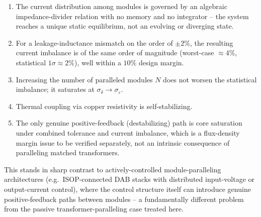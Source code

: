 \documentclass[11pt,a4paper]{article}
\begin{document}
\begin{enumerate}
  \item The current distribution among modules is governed by an algebraic impedance-divider relation with no memory and no integrator -- the system reaches a unique static equilibrium, not an evolving or diverging state.
  \item For a leakage-inductance mismatch on the order of $\pm 2\%$, the resulting current imbalance is of the same order of magnitude (worst-case $\approx 4\%$, statistical $1\sigma\approx 2\%$), well within a $10\%$ design margin.
  \item Increasing the number of paralleled modules $N$ does not worsen the statistical imbalance; it saturates at $\sigma_\delta\to\sigma_\varepsilon$.
  \item Thermal coupling via copper resistivity is self-stabilizing.
  \item The only genuine positive-feedback (destabilizing) path is core saturation under combined tolerance and current imbalance, which is a flux-density margin issue to be verified separately, not an intrinsic consequence of paralleling matched transformers.
\end{enumerate}

This stands in sharp contrast to actively-controlled module-paralleling architectures (e.g.\ ISOP-connected DAB stacks with distributed input-voltage or output-current control), where the control structure itself can introduce genuine positive-feedback paths between modules -- a fundamentally different problem from the passive transformer-paralleling case treated here.
\end{document}

